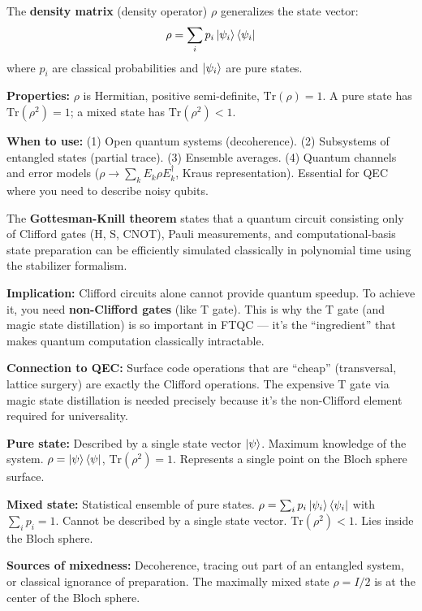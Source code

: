 \documentclass[11pt,a4paper]{article}
\begin{document}
\begin{answerbox}
The \textbf{density matrix} (density operator) $\rho$ generalizes the state vector:
\[
\rho = \sum_i p_i \ket{\psi_i}\bra{\psi_i}
\]
where $p_i$ are classical probabilities and $\ket{\psi_i}$ are pure states.

\textbf{Properties:} $\rho$ is Hermitian, positive semi-definite, $\text{Tr}(\rho) = 1$. A pure state has $\text{Tr}(\rho^2) = 1$; a mixed state has $\text{Tr}(\rho^2) < 1$.

\textbf{When to use:} (1) Open quantum systems (decoherence). (2) Subsystems of entangled states (partial trace). (3) Ensemble averages. (4) Quantum channels and error models ($\rho \to \sum_k E_k \rho E_k^\dagger$, Kraus representation). Essential for QEC where you need to describe noisy qubits.
\end{answerbox}

\begin{answerbox}
The \textbf{Gottesman-Knill theorem} states that a quantum circuit consisting only of Clifford gates (H, S, CNOT), Pauli measurements, and computational-basis state preparation can be efficiently simulated classically in polynomial time using the stabilizer formalism.

\textbf{Implication:} Clifford circuits alone cannot provide quantum speedup. To achieve it, you need \textbf{non-Clifford gates} (like T gate). This is why the T gate (and magic state distillation) is so important in FTQC --- it's the ``ingredient'' that makes quantum computation classically intractable.

\textbf{Connection to QEC:} Surface code operations that are ``cheap'' (transversal, lattice surgery) are exactly the Clifford operations. The expensive T gate via magic state distillation is needed precisely because it's the non-Clifford element required for universality.
\end{answerbox}

\begin{answerbox}
\textbf{Pure state:} Described by a single state vector $\ket{\psi}$. Maximum knowledge of the system. $\rho = \ket{\psi}\bra{\psi}$, $\text{Tr}(\rho^2) = 1$. Represents a single point on the Bloch sphere surface.

\textbf{Mixed state:} Statistical ensemble of pure states. $\rho = \sum_i p_i \ket{\psi_i}\bra{\psi_i}$ with $\sum_i p_i = 1$. Cannot be described by a single state vector. $\text{Tr}(\rho^2) < 1$. Lies inside the Bloch sphere.

\textbf{Sources of mixedness:} Decoherence, tracing out part of an entangled system, or classical ignorance of preparation. The maximally mixed state $\rho = I/2$ is at the center of the Bloch sphere.
\end{answerbox}
\end{document}
